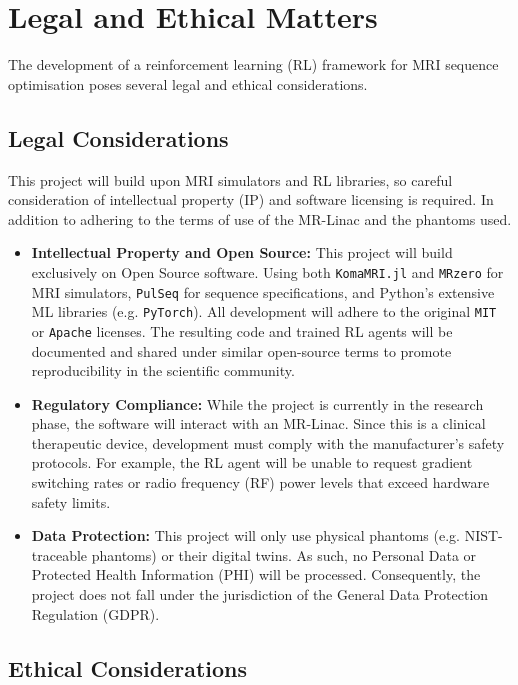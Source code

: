 \section{Legal and Ethical Matters}

The development of a reinforcement learning (RL) framework for MRI sequence optimisation poses several legal and ethical considerations.

\subsection{Legal Considerations}

This project will build upon MRI simulators and RL libraries, so careful consideration of intellectual property (IP) and software licensing is required. In addition to adhering to the terms of use of the MR-Linac and the phantoms used. 

\begin{itemize}
    \item \textbf{Intellectual Property and Open Source:} This project will build exclusively on Open Source software. Using both \texttt{KomaMRI.jl} and \texttt{MRzero} for MRI simulators, \texttt{PulSeq} for sequence specifications, and Python's extensive ML libraries (e.g. \texttt{PyTorch}). All development will adhere to the original \texttt{MIT} or \texttt{Apache} licenses. The resulting code and trained RL agents will be documented and shared under similar open-source terms to promote reproducibility in the scientific community.
    \item \textbf{Regulatory Compliance:} While the project is currently in the research phase, the software will interact with an MR-Linac. Since this is a clinical therapeutic device, development must comply with the manufacturer’s safety protocols. For example, the RL agent will be unable to request gradient switching rates or radio frequency (RF) power levels that exceed hardware safety limits.
    \item \textbf{Data Protection:} This project will only use physical phantoms (e.g. NIST-traceable phantoms) or their digital twins. As such, no Personal Data or Protected Health Information (PHI) will be processed. Consequently, the project does not fall under the jurisdiction of the General Data Protection Regulation (GDPR).
\end{itemize}

\subsection{Ethical Considerations}

